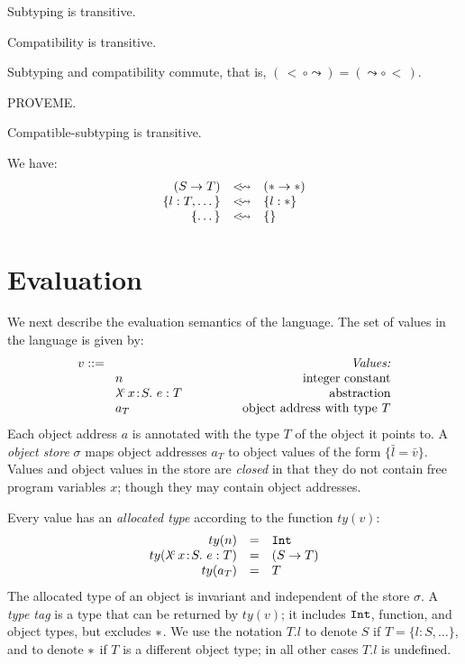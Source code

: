 \documentclass{article}
\newcommand{\myclearpage}{}
\newcommand{\lam}[5]{\lambda\!^{#1}\,#2\!:\!#3.\,\,#5:#4}
\newcommand{\lamt}[2]{#1\rightarrow #2}
\newcommand{\Int}{\t{Int}}
\newcommand{\Bool}{\t{Bool}}
\newcommand{\dynamic}{\t{*}}
\newcommand{\subtypeword}{\,<\,}
\newcommand{\subtype}[2]{#1 \subtypeword #2}
\newcommand{\compatible}[2]{#1 \leadsto #2}
\newcommand{\comsubtype}[2]{#1 <\!\!\leadsto #2}
\renewcommand{\t}[1]{{\tt #1}}
\newcommand{\objty}[1]{\{#1\}}
\newcommand{\objv}[1]{\{#1\}}
\newcommand{\allocty}[1]{ty(#1)}
\begin{document}
\begin{lemma}
Subtyping is transitive.
\end{lemma}
\begin{lemma}
Compatibility is transitive.
\end{lemma}
\begin{lemma}
Subtyping and compatibility commute, that is, $(\subtype{}{}\circ \compatible{}{} )=( \compatible{}{}\circ \subtype{}{})$.
\end{lemma}
PROVEME.
\begin{lemma}
Compatible-subtyping is transitive.
\end{lemma}


We have:
\[
\begin{array}{rcl}
	(\lamt{S}{T})  		&\comsubtype{}{}&  (\lamt\dynamic\dynamic) \\
	\objty{l:T,\dots}		& \comsubtype{}{}&  \objty{l:\dynamic} \\
	\objty{\dots}	   	& \comsubtype{}{}&  \objty{} \\
\end{array}
\]

\myclearpage
\section{Evaluation}

We next describe the evaluation semantics of the language. 
The set of values in the language is given by:
\[
\begin{array}{llr}
	\mydefhead{v ::=\qquad\qquad\qquad\qquad\qquad}{Values:} 
	\mydefcase{n								}{integer constant} 
	\mydefcase{\lam{c}{x}{S}{T}{e} 				}{abstraction} 
	\mydefcase{a_T							}{object address with type $T$}
\end{array}
\]
Each object address $a$ is annotated with the type $T$ of the object it points to.
A \emph{object store} $\sigma$ maps object addresses $a_T$ to object values of the form $\objv{\bar{l}=\bar v}$.
Values and object values in the store are \emph{closed} in that they do not contain free program variables $x$;
though they may contain object addresses.

Every value has an \emph{allocated type} according to the function $\allocty{v}$:
\[
\begin{array}{rcll}
		\allocty{n}&=&\Int \\
		\allocty{\lam{c}{x}{S}{T}{e}}&=&(\lamt{S}{T})\\
		\allocty{a_T}&=&T   
\end{array}
\]
The allocated type of an object is invariant and independent of the store $\sigma$. 
A \emph{type tag} is a type that can be returned by $\allocty{v}$; it includes $\Int$, function, and object types, but excludes $\dynamic$. 
We use the notation $T.l$ to denote $S$ if $T=\objty{l:S,\dots}$, and to denote $\dynamic$ if $T$ is a different object type; in all other cases $T.l$ is undefined.
\end{document}
